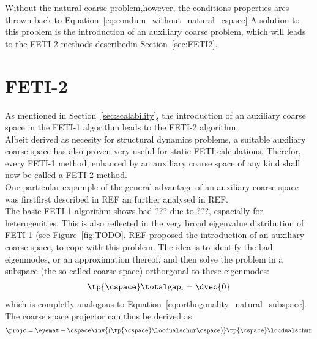 \documentclass[preview]{standalone} %
\def\tikzpath{./fig/tikz}
\begin{document}
Without the natural coarse problem,however, the conditions properties ares thrown back to Equation~\eqref{eq:condum_without_natural_cspace}
A solution to this problem is the introduction of an auxiliary coarse problem, which will leads to the FETI-2 methods describedin Section~\ref{sec:FETI2}.


\section{FETI-2}
As mentioned in Section~\ref{sec:scalability}, the introduction of an auxiliary coarse space in the FETI-1 algorithm leads to the FETI-2 algorithm.\\
Albeit derived as necesity for structural dynamics problems, a suitable auxiliary coarse space has also proven very useful for static FETI calculations. Therefor, every FETI-1 method, enhanced by an auxiliary coarse space of any kind shall now be called a FETI-2 method.\\

One particular expample of the general advantage of an auxiliary coarse space was firstfirst described in REF an further analysed in REF.\\
The basic FETI-1 algorithm shows bad ??? due to ???, espacially for heterogenities. This is also reflected in the very broad eigenvalue distribution of FETI-1 (see Figure~\ref{fig:TODO}.
REF proposed the introduction of an auxiliary coarse space, to cope with this problem. The idea is to identify the bad eigenmodes, or an approximation thereof, and then solve the problem in a subspace (the so-called coarse space) orthorgonal to these eigenmodes:
\begin{align}
\tp{\cspace}\totalgap_i=\dvec{0}
\label{eq:orthogonality_coarse_subspace}
\end{align}
which is completly analogous to Equation~\eqref{eq:orthogonality_natural_subspace}.\\
The coarse space projector can thus be derived as
\begin{align}
\projc=\eyemat-\cspace\inv{(\tp{\cspace}\locdualschur\cspace)}\tp{\cspace}\locdualschur
\end{align}

\end{document}

